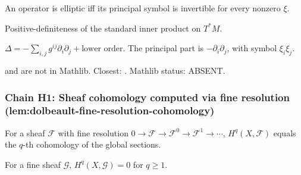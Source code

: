 \begin{lemma}[Pass F1H.2: ellipticity = invertible principal symbol]
\label{lem:hle-r2}
An operator is elliptic iff its principal symbol is invertible for every nonzero $\xi$.
\leanok
\end{lemma}

\begin{lemma}
\label{lem:hle-r3}
Positive-definiteness of the standard inner product on $T^{*}M$.
\leanok
\end{lemma}

\begin{lemma}
\label{lem:hle-r4}
$\Delta = -\sum_{i,j} g^{ij}\partial_{i}\partial_{j} + \text{lower order}$.  The principal part is $-\partial_{i}\partial_{j}$, with symbol $\xi_{i}\xi_{j}$.
\leanok
\end{lemma}

\begin{lemma}
\label{lem:hle-r5}
 and  are not in Mathlib.  Closest: .  Mathlib status: ABSENT.
\leanok
\end{lemma}

\subsubsection*{Chain H1: Sheaf cohomology computed via fine resolution (lem:dolbeault-fine-resolution-cohomology)}

\begin{lemma}
\label{lem:dfr-r1}
For a sheaf $\mathcal{F}$ with fine resolution $0\to\mathcal{F}\to\mathcal{F}^{0}\to\mathcal{F}^{1}\to\cdots$, $H^{q}(X,\mathcal{F})$ equals the $q$-th cohomology of the global sections.
\leanok
\end{lemma}

\begin{lemma}
\label{lem:dfr-r2}
For a fine sheaf $\mathcal{G}$, $H^{q}(X,\mathcal{G}) = 0$ for $q \geq 1$.
\leanok
\end{lemma}

